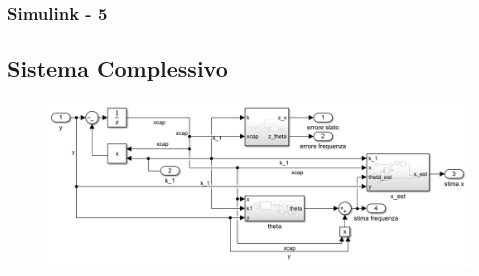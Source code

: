 \documentclass{beamer}
\begin{document}
\begin{frame}
    \frametitle{Simulink - 5} %
    \subsection{Sistema Complessivo}
    \begin{figure}
            \includegraphics[scale=0.4]{2022-05-15-18-01-35.png} %
        \end{figure}
\end{frame}
\end{document}
